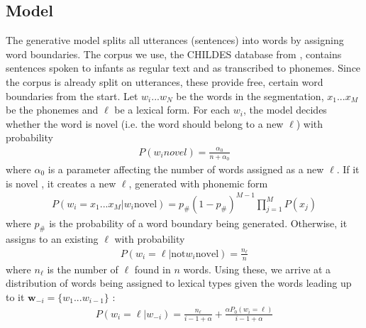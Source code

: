 \documentclass[11pt]{article}
\begin{document}
\subsection{Model}
The generative model splits all utterances (sentences) into words by assigning word boundaries. The corpus we use, the CHILDES database from \cite{mac1985}, contains sentences spoken to infants as regular text and as transcribed to phonemes. Since the corpus is already split on utterances, these provide free, certain word boundaries from the start. Let $w_i ... w_N$ be the words in the segmentation, $x_1 ... x_M$ be the phonemes and $\ell$ be a lexical form. For each $w_i$, the model decides whether the word is novel (i.e. the word should belong to a new $\ell$) with probability
\begin{align}
P(w_i novel) = \frac{\alpha_0}{n+\alpha_0}
\end{align}
where $\alpha_0$ is a parameter affecting the number of words assigned as a new $\ell$. If it is novel , it creates a new $\ell$, generated with phonemic form
\begin{align}
P(w_i = x_1 ... x_M | w_i  \text{novel}) = p_\# (1-p_\#)^{M-1} \prod_{j=1}^M P(x_j)
\end{align}
where $p_\#$ is the probability of a word boundary being generated. Otherwise, it assigns to an existing $\ell$ with probability
\begin{align}
P(w_i = \ell | \text{not} w_i \text{novel}) = \frac{n_\ell}{n}
\end{align}
where $n_\ell$ is the number of $\ell$ found in $n$ words. Using these, we arrive at a distribution of words being assigned to lexical types given the words leading up to it $\textbf{w}_{-i} = \{ w_1 ... w_{i-1}\}$ :
\begin{align}
P(w_i = \ell | w_{-i}) = \frac{n_\ell}{i-1+\alpha} + \frac{\alpha P_0 (w_i = \ell )}{i - 1 + \alpha}
\end{align}
\end{document}
